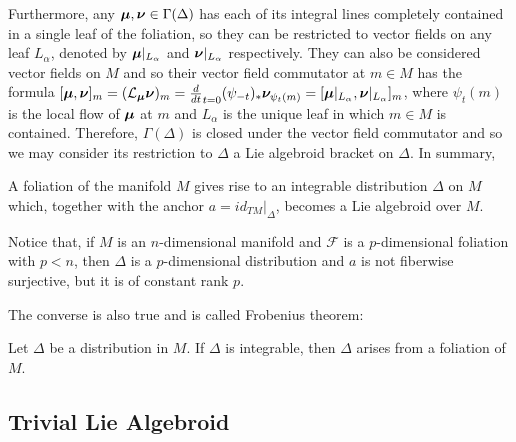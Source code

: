 Furthermore, any $\bm{\mu}, \bm{\nu} \in \Gamma(\Delta)$ has each of its integral lines completely contained in a single leaf of the foliation, so they can be restricted to vector fields on any leaf $L_\alpha$, denoted by $\bm{\mu}|_{L_\alpha}$ and $\bm{\nu}|_{L_\alpha}$ respectively. They can also be considered vector fields on $M$ and so their vector field commutator at $m \in M$ has the formula $[\bm{\mu}, \bm{\nu}]_m = (\mathcal L_{\bm{\mu}} \bm{\nu})_m = \frac{d}{dt}_{t=0} (\psi_{-t})_* \bm{\nu}_{\psi_t(m)} = [\bm{\mu}|_{L_\alpha}, \bm{\nu}|_{L_\alpha}]_m$, where $\psi_t(m)$ is the local flow of $\bm{\mu}$ at $m$ and $L_\alpha$ is the unique leaf in which $m \in M$ is contained. Therefore, $\Gamma(\Delta)$ is closed under the vector field commutator and so we may consider its restriction to $\Delta$ a Lie algebroid bracket on $\Delta$. In summary, 
\begin{proposition}
A foliation of the manifold $M$ gives rise to an integrable distribution $\Delta$ on $M$ which, together with the anchor $a = id_{TM}|_\Delta$, becomes a Lie algebroid over $M$.
\end{proposition}
Notice that, if $M$ is an $n$-dimensional manifold and $\mathcal F$ is a $p$-dimensional foliation with $p < n$, then $\Delta$ is a $p$-dimensional distribution and $a$ is not fiberwise surjective, but it is of constant rank $p$.

The converse is also true and is called Frobenius theorem:

\begin{proposition}
Let $\Delta$ be a distribution in $M$. If $\Delta$ is integrable, then $\Delta$ arises from a foliation of $M$.
\end{proposition}



\subsection{Trivial Lie Algebroid}

